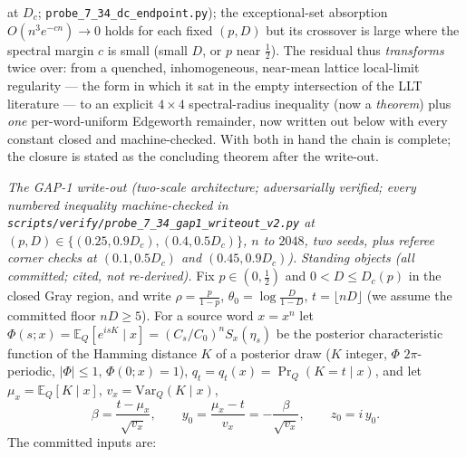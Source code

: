 \documentclass[
]{article}
\begin{document}
at $D_c$; \texttt{probe\_7\_34\_dc\_endpoint.py}); the exceptional-set
absorption $O(n^3e^{-cn})\to0$ holds for each fixed $(p,D)$ but its crossover is large where the
spectral margin $c$ is small (small $D$, or $p$ near $\tfrac12$). The residual thus \emph{transforms} twice over: from a quenched, inhomogeneous,
near-mean lattice local-limit regularity --- the form in which it sat in the empty intersection of the
LLT literature --- to an explicit $4\times4$ spectral-radius inequality (now a \emph{theorem}) plus
\emph{one} per-word-uniform Edgeworth remainder, now written out below with every constant
closed and machine-checked. With both in hand the chain is complete; the closure is stated as the
concluding theorem after the write-out.

\emph{The GAP-1 write-out (two-scale architecture; adversarially verified; every numbered inequality machine-checked in \texttt{scripts/verify/probe\_7\_34\_gap1\_writeout\_v2.py} at $(p,D)\in\{(0.25,0.9D_c),(0.4,0.5D_c)\}$, $n$ to $2048$, two seeds, plus referee corner checks at $(0.1,0.5D_c)$ and $(0.45,0.9D_c)$).} \emph{Standing objects (all committed; cited, not re-derived).}
Fix $p\in(0,\tfrac12)$ and $0<D\le D_c(p)$ in the closed Gray region, and
write $\rho=\tfrac{p}{1-p}$, $\theta_0=\log\tfrac{D}{1-D}$,
$t=\lfloor nD\rfloor$ (we assume the committed floor $nD\ge5$).  For a
source word $x=x^n$ let $\Phi(s;x)=\mathbb E_Q[e^{isK}\mid x]
=(C_s/C_0)^n S_x(\eta_s)$ be the posterior characteristic function of the
Hamming distance $K$ of a posterior draw ($K$ integer, $\Phi$
$2\pi$-periodic, $|\Phi|\le1$, $\Phi(0;x)=1$), $q_t=q_t(x)=\Pr_Q(K=t\mid
x)$, and let $\mu_x=\mathbb E_Q[K\mid x]$, $v_x=\mathrm{Var}_Q(K\mid x)$,
\[
  \beta=\frac{t-\mu_x}{\sqrt{v_x}},\qquad
  y_0=\frac{\mu_x-t}{v_x}=-\frac{\beta}{\sqrt{v_x}},\qquad
  z_0=i\,y_0 .
\]
The committed inputs are:
\end{document}
